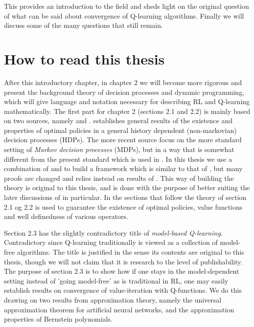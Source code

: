 This provides an introduction to the field and sheds light 
on the original question of what can be said about convergence of
Q-learning algorithms. Finally we will discuss some of the many questions that
still remain.

\section{How to read this thesis}

After this introductory chapter,
in chapter 2 we will become more rigorous and
present the background theory of decision processes and dynamic programming,
which will give language and notation necessary for describing
RL and Q-learning mathematically.
The first part for chapter 2 (sections 2.1 and 2.2) is mainly based on two
sources, namely  and .
 establishes general results of the existence and properties of
optimal policies in a general history dependent (non-markovian)
decision processes (HDPs).
The more recent source  focus on the more standard setting
of \emph{Markov decision processes} (MDPs),
but in a way that is somewhat different from the present standard which
is used in .
In this thesis we use a combination of  and  to
build a framework which is similar to that of ,
but many proofs are changed and relies instead on results of .
This way of building the theory is original to this thesis, and
is done with the purpose of better suiting the later discussions
of  in particular.
In the sections that follow the theory of section 2.1 og 2.2
is used to guarantee the existence of optimal policies, value functions
and well definedness of various operators.

Section 2.3 has the slightly contradictory title of \emph{model-based Q-learning}.
Contradictory since Q-learning traditionally is viewed as a collection of
model-free algorithms.
The title is justified in the sense its contents are original to this thesis,
though we will not claim that it is research to the level of publishability.
The purpose of section 2.3 is to show how if one stays in the model-dependent
setting instead of 'going model-free' as is traditional in RL, 
one may easily establish results on convergence of value-iteration with
Q-functions. We do this drawing on two results from approximation theory,
namely the universal approximation theorem for artificial neural networks,
and the approximation properties of Bernstein polynomials.

